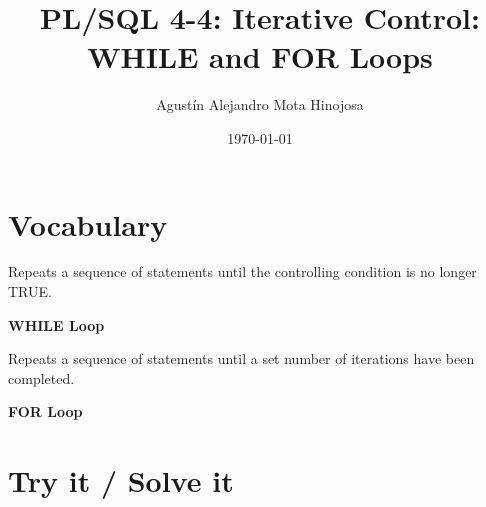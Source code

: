 \documentclass[11pt]{article}
\author{Agustín Alejandro Mota Hinojosa}
\date{\today}
\title{PL/SQL 4-4: Iterative Control: WHILE and FOR Loops}
\begin{document}
\maketitle
\tableofcontents

\section{Vocabulary}
\label{sec:org6332a30}

Repeats a sequence of statements until the controlling condition is no longer TRUE.

\textbf{WHILE Loop}

Repeats a sequence of statements until a set number of iterations have been completed.

\textbf{FOR Loop}
\section{Try it / Solve it}
\label{sec:org2c4fc92}
\end{document}
